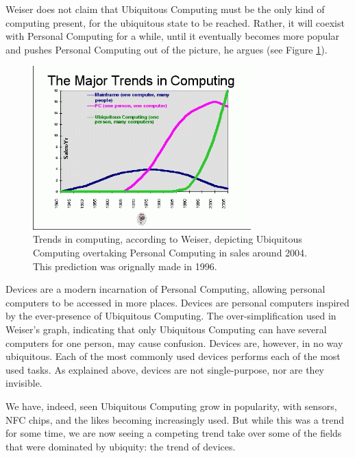 Weiser does not claim that Ubiquitous Computing must be the only kind of computing present, for the ubiquitous state to be reached.
Rather, it will coexist with Personal Computing for a while, until it eventually becomes more popular and pushes Personal Computing
out of the picture, he argues (see Figure \ref{fig:trends-graph}).

\begin{figure}[ht]
	\centering
	\includegraphics[width=0.75\textwidth]{multipurpose/trends-graph}
	\caption{Trends in computing, according to Weiser, depicting Ubiquitous Computing overtaking Personal Computing in sales around
		2004. This prediction was orignally made in 1996.\cite{weisernomadic}}
	\label{fig:trends-graph}
\end{figure}

Devices are a modern incarnation of Personal Computing, allowing personal computers to be accessed in more places. Devices are personal
computers inspired by the ever-presence of Ubiquitous Computing. The over-simplification used in Weiser's graph, indicating that only
Ubiquitous Computing can have several computers for one person, may cause confusion. Devices are, however, in no way ubiquitous. Each
of the most commonly used devices performs each of the most used tasks. As explained above, devices are not single-purpose, nor are they
invisible.

We have, indeed, seen Ubiquitous Computing grow in popularity, with sensors, NFC chips, and the likes becoming increasingly used. But
while this was a trend for some time, we are now seeing a competing trend take over some of the fields that were dominated by ubiquity:
the trend of devices.

